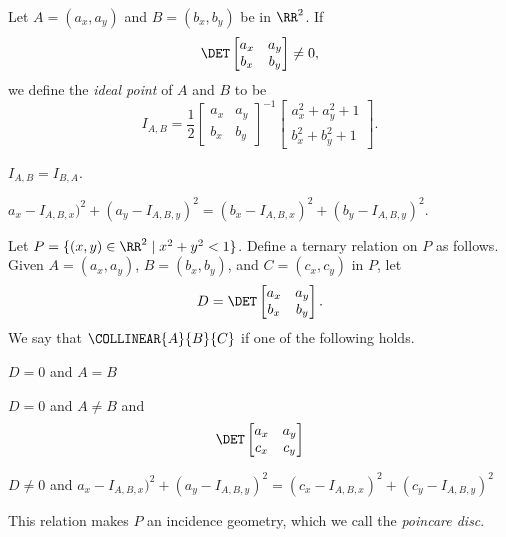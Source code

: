Let \(A = (a_x, a_y)\) and \(B = (b_x, b_y)\) be in \(\RR^2\).
If \[ \DET \begin{bmatrix} a_x & a_y \\ b_x & b_y \end{bmatrix} \neq 0, \] we define the \emph{ideal point} of \(A\) and \(B\) to be \[ I_{A,B} = \frac{1}{2} \begin{bmatrix} a_x & a_y \\ b_x & b_y \end{bmatrix}^{-1} \begin{bmatrix} a_x^2 + a_y^2 + 1 \\ b_x^2 + b_y^2 + 1 \end{bmatrix}. \]

\begin{prop}
\begin{proplist}
\item \(I_{A,B} = I_{B,A}\).
\item \(a_x - I_{A,B,x})^2 + (a_y - I_{A,B,y})^2 = (b_x - I_{A,B,x})^2 + (b_y - I_{A,B,y})^2\).
\end{proplist}
\end{prop}

\begin{prop}
Let \(P = \{ (x,y) \in \RR^2 \mid x^2 + y^2 < 1 \}\).
Define a ternary relation on \(P\) as follows.
Given \(A = (a_x,a_y)\), \(B = (b_x, b_y)\), and \(C = (c_x, c_y)\) in \(P\), let \[ D = \DET \begin{bmatrix} a_x & a_y \\ b_x & b_y \end{bmatrix}. \]
We say that \(\COLLINEAR{A}{B}{C}\) if one of the following holds.
\begin{proplist}
\item \(D = 0\) and \(A = B\)
\item \(D = 0\) and \(A \neq B\) and \[ \DET \begin{bmatrix} a_x & a_y \\ c_x & c_y \end{bmatrix} \]
\item \(D \neq 0\) and \(a_x - I_{A,B,x})^2 + (a_y - I_{A,B,y})^2 = (c_x - I_{A,B,x})^2 + (c_y - I_{A,B,y})^2\)
\end{proplist}
This relation makes \(P\) an incidence geometry, which we call the \emph{poincare disc}.
\end{prop}
